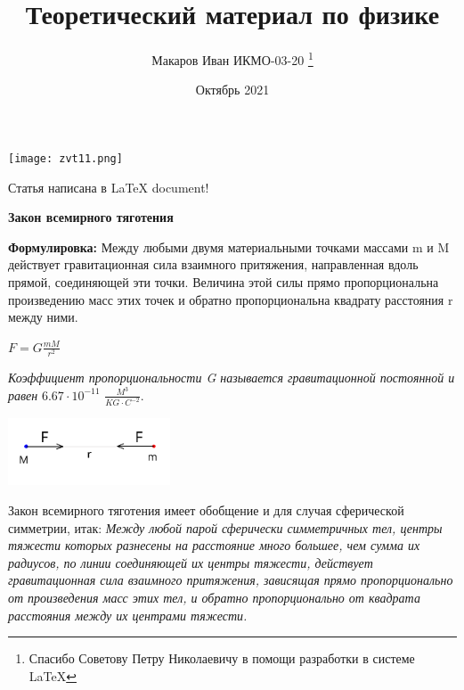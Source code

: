 \documentclass[12pt, letterpaper, twoside]{article}
\title{Теоретический материал по физике}
\author{Макаров Иван ИКМО-03-20 \thanks{Спасибо Советову Петру Николаевичу в помощи разработки в  системе LaTeX}}
\date{Октябрь 2021}
\begin{document}
\maketitle

\begin{center}    \qquad \texttt{[image: zvt11.png]}
\end{center}


\begin{center} Статья написана в \LaTeX{} document!
\end{center}



\newpage
\begin{center}
    \textbf{Закон всемирного тяготения}\\

\end{center}



\textbf{Формулировка:} Между любыми двумя материальными точками массами m и M действует гравитационная сила взаимного притяжения, направленная вдоль прямой, соединяющей эти точки. Величина этой силы прямо пропорциональна произведению масс этих точек и обратно пропорциональна квадрату расстояния r между ними.\\
\begin{center}
    $F=G\frac{mM}{r^2}$\\
\end{center}

\textit{Коэффициент пропорциональности G  называется гравитационной постоянной и равен} $6.67 \cdot 10^{-11}$ $\frac{M^3}{KG \cdot C^{-2}}$.\\

\begin{center}    \qquad \includegraphics{zvt1.png}
 
\end{center}


Закон всемирного тяготения имеет обобщение и для случая сферической симметрии, итак:
\textit{Между любой парой сферически симметричных тел, центры тяжести которых разнесены на расстояние много большее, чем сумма их радиусов, по линии соединяющей их центры тяжести, действует гравитационная сила взаимного притяжения, зависящая прямо пропорционально от произведения масс этих тел, и обратно пропорционально от квадрата расстояния между их центрами тяжести.\\}
\end{document}

